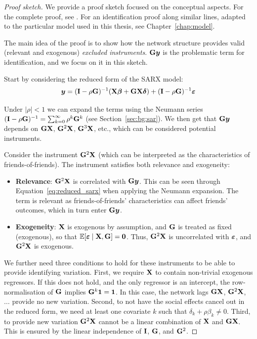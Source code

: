 \begin{proof}[Proof sketch]
We provide a proof sketch focused on the conceptual aspects. For the complete proof, see \textcite[Proposition~1, p.~44]{Bramoulle2009}. For an identification proof along similar lines, adapted to the particular model used in this thesis, see Chapter~\ref{chap:model}.

The main idea of the proof is to show how the network structure provides valid (relevant and exogenous) \emph{excluded instruments}. $\mathbf{G}\bm{y}$ is the problematic term for identification, and we focus on it in this sketch.

Start by considering the reduced form of the SARX model:
\begin{equation}
    \label{eq:reduced_sarx}
    \bm{y} = (\mathbf{I} - \rho\mathbf{G})^{-1}(\mathbf{X}\bm{\beta} + \mathbf{G}\mathbf{X}\bm{\delta}) + (\mathbf{I} - \rho\mathbf{G})^{-1}\bm{\varepsilon}
\end{equation}

Under $|\rho| < 1$ we can expand the terms using the Neumann series $(\mathbf{I} - \rho\mathbf{G})^{-1} = \sum_{k=0}^{\infty}\rho^k\mathbf{G}^k$ (see Section~\ref{sec:bg:sar}). We then get that $\mathbf{G}\bm{y}$ depends on $\mathbf{G}\mathbf{X}$, $\mathbf{G}^2\mathbf{X}$, $\mathbf{G}^3\mathbf{X}$, etc., which can be considered potential instruments.

Consider the instrument $\mathbf{G}^2\mathbf{X}$ (which can be interpreted as the characteristics of friends-of-friends). The instrument satisfies both relevance and exogeneity:

\begin{itemize}
    \item \textbf{Relevance}: $\mathbf{G}^2\mathbf{X}$ is correlated with $\mathbf{G}\bm{y}$. This can be seen through Equation~\eqref{eq:reduced_sarx} when applying the Neumann expansion. The term is relevant as friends-of-friends' characteristics can affect friends' outcomes, which in turn enter $\mathbf{G}\bm{y}$.
    \item \textbf{Exogeneity}: $\mathbf{X}$ is exogenous by assumption, and $\mathbf{G}$ is treated as fixed (exogenous), so that $\mathbb{E}[\bm{\varepsilon} \mid \mathbf{X}, \mathbf{G}] = \bm{0}$. Thus, $\mathbf{G}^2\mathbf{X}$ is uncorrelated with $\bm{\varepsilon}$, and $\mathbf{G}^2\mathbf{X}$ is exogenous.
\end{itemize}

We further need three conditions to hold for these instruments to be able to provide identifying variation. First, we require $\mathbf{X}$ to contain non-trivial exogenous regressors. If this does not hold, and the only regressor is an intercept, the row-normalisation of $\mathbf{G}$ implies $\mathbf{G}^k\bm{1} = \bm{1}$. In this case, the network lags $\mathbf{G}\mathbf{X}$, $\mathbf{G}^2\mathbf{X}$, $\ldots$ provide no new variation. Second, to not have the social effects cancel out in the reduced form, we need at least one covariate $k$ such that $\delta_k + \rho\beta_k \neq 0$. Third, to provide new variation $\mathbf{G}^2\mathbf{X}$ cannot be a linear combination of $\mathbf{X}$ and $\mathbf{G}\mathbf{X}$. This is ensured by the linear independence of $\mathbf{I}$, $\mathbf{G}$, and $\mathbf{G}^2$.


\end{proof}
